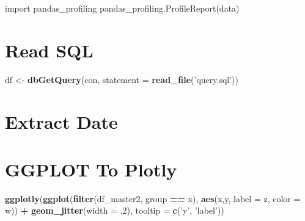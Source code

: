 \documentclass[]{book}
\newenvironment{Shaded}{\begin{snugshade}}{\end{snugshade}}
\newcommand{\KeywordTok}[1]{\textcolor[rgb]{0.13,0.29,0.53}{\textbf{#1}}}
\newcommand{\DataTypeTok}[1]{\textcolor[rgb]{0.13,0.29,0.53}{#1}}
\newcommand{\DecValTok}[1]{\textcolor[rgb]{0.00,0.00,0.81}{#1}}
\newcommand{\StringTok}[1]{\textcolor[rgb]{0.31,0.60,0.02}{#1}}
\newcommand{\ImportTok}[1]{#1}
\newcommand{\OperatorTok}[1]{\textcolor[rgb]{0.81,0.36,0.00}{\textbf{#1}}}
\newcommand{\NormalTok}[1]{#1}
\begin{document}
\begin{Shaded}
\begin{Highlighting}[]
\ImportTok{import}\NormalTok{ pandas_profiling}
\NormalTok{pandas_profiling.ProfileReport(data)}
\end{Highlighting}
\end{Shaded}

\section{Read SQL}\label{read-sql}

\begin{Shaded}
\begin{Highlighting}[]
\NormalTok{df <-}\StringTok{ }\KeywordTok{dbGetQuery}\NormalTok{(con, }\DataTypeTok{statement =} \KeywordTok{read_file}\NormalTok{(}\StringTok{'query.sql'}\NormalTok{))}
\end{Highlighting}
\end{Shaded}

\section{Extract Date}\label{extract-date}

\begin{Shaded}
\end{Shaded}

\section{GGPLOT To Plotly}\label{ggplot-to-plotly}

\begin{Shaded}
\begin{Highlighting}[]
\KeywordTok{ggplotly}\NormalTok{(}\KeywordTok{ggplot}\NormalTok{(}\KeywordTok{filter}\NormalTok{(df_master2, group }\OperatorTok{==}\StringTok{ }\NormalTok{x), }\KeywordTok{aes}\NormalTok{(x,y, }\DataTypeTok{label =}\NormalTok{ z, }\DataTypeTok{color =}\NormalTok{ w)) }\OperatorTok{+}
\StringTok{        }\KeywordTok{geom_jitter}\NormalTok{(}\DataTypeTok{width =}\NormalTok{ .}\DecValTok{2}\NormalTok{), }\DataTypeTok{tooltip =} \KeywordTok{c}\NormalTok{(}\StringTok{'y'}\NormalTok{, }\StringTok{'label'}\NormalTok{))}
\end{Highlighting}
\end{Shaded}
\end{document}
